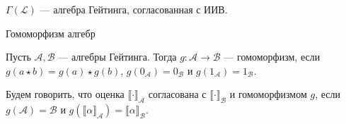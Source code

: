\documentclass[aspectratio=169]{beamer}
\begin{document}
\begin{frame}{$\Gamma(\mathcal{L})$ --- алгебра Гейтинга, согласованная с ИИВ.}
%
\end{frame}

\begin{frame}{Гомоморфизм алгебр}
\begin{defrus}Пусть $\mathcal{A}, \mathcal{B}$ --- алгебры Гейтинга. Тогда $g: \mathcal{A} \rightarrow \mathcal{B}$ --- гомоморфизм,
если $g(a \star b) = g(a) \star g(b)$, $g(0_\mathcal{A}) = 0_\mathcal{B}$ и $g(1_\mathcal{A}) = 1_\mathcal{B}$.\end{defrus}
\begin{defrus}Будем говорить, что оценка $\llbracket\cdot\rrbracket_\mathcal{A}$ согласована
с $\llbracket\cdot\rrbracket_\mathcal{B}$ и гомоморфизмом $g$, если $g(\mathcal{A}) = \mathcal{B}$ и
$g(\llbracket\alpha\rrbracket_\mathcal{A}) = \llbracket\alpha\rrbracket_\mathcal{B}$.
\end{defrus}
\end{frame}
\end{document}
